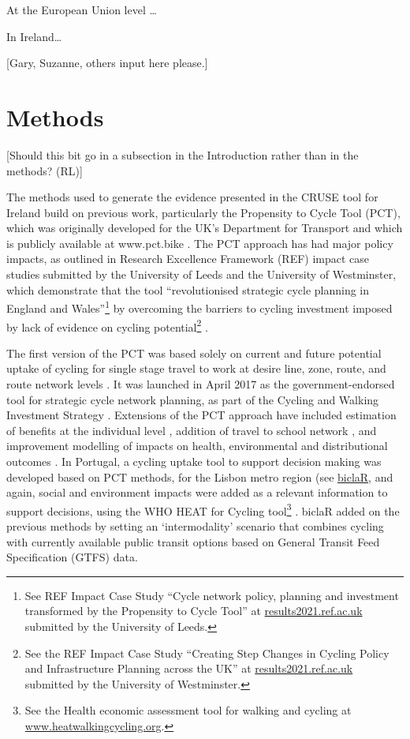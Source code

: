 \documentclass[
  super,
  preprint,
  3p]{elsarticle}
\begin{document}
At the European Union level \ldots{}

In Ireland\ldots{}

{[}Gary, Suzanne, others input here please.{]}

\hypertarget{methods}{%
\section{Methods}\label{methods}}

{[}Should this bit go in a subsection in the Introduction rather than in
the methods? (RL){]}

The methods used to generate the evidence presented in the CRUSE tool
for Ireland build on previous work, particularly the Propensity to Cycle
Tool (PCT), which was originally developed for the UK's Department for
Transport and which is publicly available at www.pct.bike
\citep{lovelace2017}. The PCT approach has had major policy impacts, as
outlined in Research Excellence Framework (REF) impact case studies
submitted by the University of Leeds and the University of Westminster,
which demonstrate that the tool ``revolutionised strategic cycle
planning in England and Wales''\footnote{See REF Impact Case Study
  ``Cycle network policy, planning and investment transformed by the
  Propensity to Cycle Tool'' at
  \href{https://results2021.ref.ac.uk/impact/847d1191-7f25-46ba-a399-b481125edc8f}{results2021.ref.ac.uk}
  submitted by the University of Leeds.} by overcoming the barriers to
cycling investment imposed by lack of evidence on cycling
potential\footnote{See the REF Impact Case Study ``Creating Step Changes
  in Cycling Policy and Infrastructure Planning across the UK'' at
  \href{https://results2021.ref.ac.uk/impact/4BBF3436-FD10-4C75-9791-F5E98AB4411B}{results2021.ref.ac.uk}
  submitted by the University of Westminster.} .

The first version of the PCT was based solely on current and future
potential uptake of cycling for single stage travel to work at desire
line, zone, route, and route network levels \citep{lovelace2016}. It was
launched in April 2017 as the government-endorsed tool for strategic
cycle network planning, as part of the Cycling and Walking Investment
Strategy \citep{cycling2017}. Extensions of the PCT approach have
included estimation of benefits at the individual level
\citep{woodcock2018}, addition of travel to school network
\citep{goodman2019}, and improvement modelling of impacts on health,
environmental and distributional outcomes \citep{woodcock2021}. In
Portugal, a cycling uptake tool to support decision making was developed
based on PCT methods, for the Lisbon metro region (see
\href{https://biclar.tmlmobilidade.pt}{biclaR}, and again, social and
environment impacts were added as a relevant information to support
decisions, using the WHO HEAT for Cycling tool\footnote{See the Health
  economic assessment tool for walking and cycling at
  \href{https://www.heatwalkingcycling.org/\#homepage}{www.heatwalkingcycling.org}.}
\citep{felix2023}. biclaR added on the previous methods by setting an
`intermodality' scenario that combines cycling with currently available
public transit options based on General Transit Feed Specification
(GTFS) data.
\end{document}
